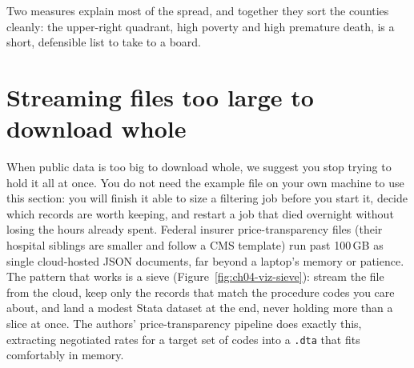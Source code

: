 Two measures explain most of the spread, and together they sort the counties cleanly: the upper-right quadrant, high poverty and high premature death, is a short, defensible list to take to a board.

\section{Streaming files too large to download whole}
When public data is too big to download whole, we suggest you stop trying to hold it all at once. You do not need the example file on your own machine to use this section: you will finish it able to size a filtering job before you start it, decide which records are worth keeping, and restart a job that died overnight without losing the hours already spent. Federal insurer price-transparency files (their hospital siblings are smaller and follow a CMS template) run past 100\,GB as single cloud-hosted JSON documents, far beyond a laptop's memory or patience. The pattern that works is a sieve (Figure~\ref{fig:ch04-viz-sieve}): stream the file from the cloud, keep only the records that match the procedure codes you care about, and land a modest Stata dataset at the end, never holding more than a slice at once. The authors' price-transparency pipeline does exactly this, extracting negotiated rates for a target set of codes into a \texttt{.dta} that fits comfortably in memory.


